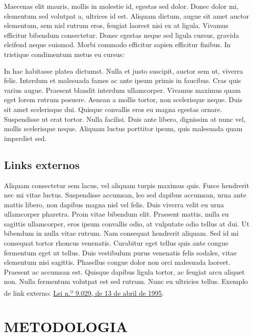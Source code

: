 \documentclass[
	12pt,				%
	a4paper,			%
    openany,
    oneside,
	english,			%
	french,				%
	spanish,			%
	brazil,				%
	]{abntex2}
\begin{document}
Maecenas elit mauris, mollis in molestie id, egestas sed dolor. Donec dolor mi, elementum sed volutpat a, ultrices id est. Aliquam dictum, augue sit amet auctor elementum, sem nisl rutrum eros, feugiat laoreet nisi ex at ligula. Vivamus efficitur bibendum consectetur. Donec egestas neque sed ligula cursus, gravida eleifend neque euismod. Morbi commodo efficitur sapien efficitur finibus. In tristique condimentum metus eu cursus:

\begin{citacao}
\par In hac habitasse platea dictumst. Nulla et justo suscipit, auctor sem ut, viverra felis. Interdum et malesuada fames ac ante ipsum primis in faucibus. Cras quis varius augue. Praesent blandit interdum ullamcorper. Vivamus maximus quam eget lorem rutrum posuere. Aenean a mollis tortor, non scelerisque neque. Duis sit amet scelerisque dui. Quisque convallis eros eu magna egestas ornare. Suspendisse ut erat tortor. Nulla facilisi. Duis ante libero, dignissim at nunc vel, mollis scelerisque neque. Aliquam luctus porttitor ipsum, quis malesuada quam imperdiet sed.
\end{citacao}

\section{Links externos}

Aliquam consectetur sem lacus, vel aliquam turpis maximus quis. Fusce hendrerit nec mi vitae luctus. Suspendisse accumsan, leo sed dapibus accumsan, urna ante mattis libero, non dapibus magna nisl vel felis. Duis viverra velit eu urna ullamcorper pharetra. Proin vitae bibendum elit. Praesent mattis, nulla eu sagittis ullamcorper, eros ipsum convallis odio, at vulputate odio tellus at dui. Ut bibendum in nulla vitae rutrum. Nam consequat hendrerit aliquam. Sed id mi consequat tortor rhoncus venenatis. Curabitur eget tellus quis ante congue fermentum eget ut tellus. Duis vestibulum purus venenatis felis sodales, vitae elementum nisi sagittis. Phasellus congue dolor non orci malesuada laoreet. Praesent ac accumsan est. Quisque dapibus ligula tortor, ac feugiat arcu aliquet non. Nulla fermentum volutpat est sed rutrum. Nunc eu ultricies tellus. Exemplo de link externo: \href{http://www.planalto.gov.br/ccivil_03/LEIS/L9029.HTM}{Lei n.\textsuperscript{\d o} 9.029, de 13 de abril de 1995}.

\chapter{METODOLOGIA}
\end{document}
